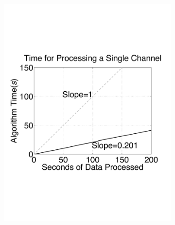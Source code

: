 \begin{center}
\begin{figure}[h!]
\begin{subfigure}[b]{.5\textwidth}
\includegraphics[width=\textwidth]{../figs/new/timingsinglechannel.pdf}
\caption{}
\label{fig:ICold}
\end{subfigure}
\begin{subfigure}[b]{.5\textwidth}
\caption{}
\label{fig:ICold}
\end{subfigure}
\caption{ 
} \label{fig:timing}
\end{figure}
\end{center}

